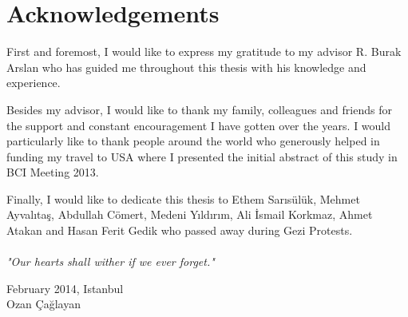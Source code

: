 \documentclass[12pt]{article}
\title{}
\numberwithin{equation}{section}
\numberwithin{figure}{section}
\numberwithin{table}{section}
\begin{document}
%



\clearpage
\vspace*{-0.35cm}
\section*{Acknowledgements}
\vspace*{6pt}
\par{
    First and foremost, I would like to express my gratitude to my advisor
    R. Burak Arslan who has guided me throughout this thesis with
    his knowledge and experience.
}
\par{
    Besides my advisor, I would like to thank my family, colleagues and friends
    for the support and constant encouragement I have gotten over the years.
    I would particularly like to thank people around the world who generously helped
    in funding my travel to USA where I presented the initial abstract of this study
    in BCI Meeting 2013.
}
\par{
    Finally, I would like to dedicate this thesis to Ethem Sarısülük,
    Mehmet Ayvalıtaş, Abdullah Cömert, Medeni Yıldırım, Ali İsmail Korkmaz,
    Ahmet Atakan and Hasan Ferit Gedik who passed away during Gezi Protests.\\\\
    \emph{"Our hearts shall wither if we ever forget."}
}

\vspace*{2cm}
\begin{flushright}
February 2014, Istanbul \\
Ozan Çağlayan
\end{flushright}
\clearpage

\setcounter{tocdepth}{5}
\renewcommand\contentsname{\normalsize\bfseries Table of Contents}
\thispagestyle{empty}
\vspace*{0.15cm}
\tableofcontents
\clearpage

\renewcommand\nomname{\normalsize\bfseries List of Abbreviations}
\thispagestyle{empty}
\vspace*{0.15cm}
\printnomenclature
\clearpage
\end{document}
